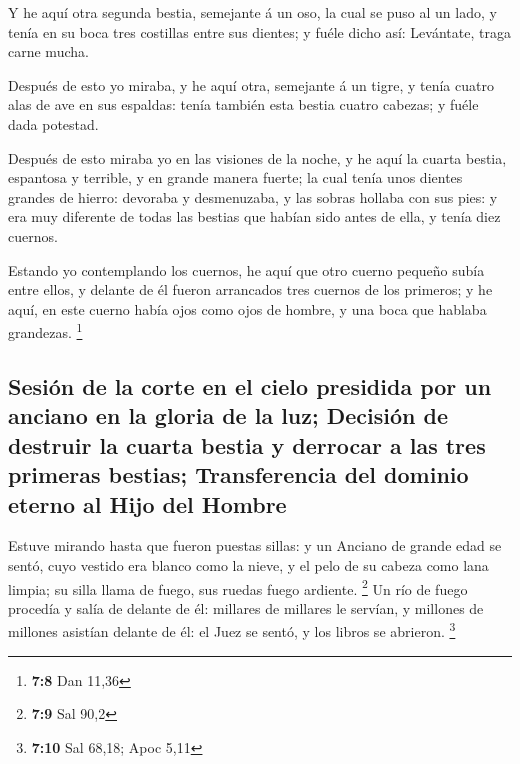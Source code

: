  Y he aquí otra segunda bestia, semejante á un oso, la cual
se puso al un lado, y tenía en su boca tres costillas entre sus dientes;
y fuéle dicho así: Levántate, traga carne mucha.

 Después de esto yo miraba, y he aquí otra, semejante á un
tigre, y tenía cuatro alas de ave en sus espaldas: tenía también esta
bestia cuatro cabezas; y fuéle dada potestad.

 Después de esto miraba yo en las visiones de la noche, y he
aquí la cuarta bestia, espantosa y terrible, y en grande manera fuerte;
la cual tenía unos dientes grandes de hierro: devoraba y desmenuzaba, y
las sobras hollaba con sus pies: y era muy diferente de todas las
bestias que habían sido antes de ella, y tenía diez cuernos.

 Estando yo contemplando los cuernos, he aquí que otro
cuerno pequeño subía entre ellos, y delante de él fueron arrancados tres
cuernos de los primeros; y he aquí, en este cuerno había ojos como ojos
de hombre, y una boca que hablaba grandezas. \footnote{\textbf{7:8} Dan
  11,36}

\hypertarget{sesiuxf3n-de-la-corte-en-el-cielo-presidida-por-un-anciano-en-la-gloria-de-la-luz-decisiuxf3n-de-destruir-la-cuarta-bestia-y-derrocar-a-las-tres-primeras-bestias-transferencia-del-dominio-eterno-al-hijo-del-hombre}{%
\subsection{Sesión de la corte en el cielo presidida por un anciano en
la gloria de la luz; Decisión de destruir la cuarta bestia y derrocar a
las tres primeras bestias; Transferencia del dominio eterno al Hijo del
Hombre}\label{sesiuxf3n-de-la-corte-en-el-cielo-presidida-por-un-anciano-en-la-gloria-de-la-luz-decisiuxf3n-de-destruir-la-cuarta-bestia-y-derrocar-a-las-tres-primeras-bestias-transferencia-del-dominio-eterno-al-hijo-del-hombre}}

 Estuve mirando hasta que fueron puestas sillas: y un
Anciano de grande edad se sentó, cuyo vestido era blanco como la nieve,
y el pelo de su cabeza como lana limpia; su silla llama de fuego, sus
ruedas fuego ardiente. \footnote{\textbf{7:9} Sal 90,2}  Un
río de fuego procedía y salía de delante de él: millares de millares le
servían, y millones de millones asistían delante de él: el Juez se
sentó, y los libros se abrieron. \footnote{\textbf{7:10} Sal 68,18; Apoc
  5,11}

